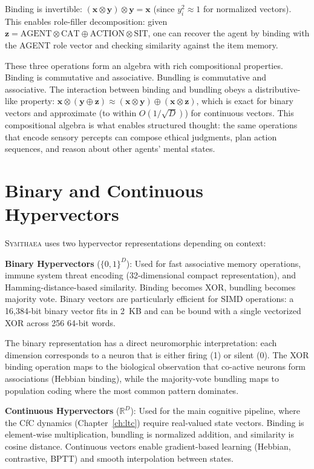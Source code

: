 \documentclass[12pt]{book}
\newcommand{\bind}{\otimes}
\newcommand{\bundle}{\oplus}
\newcommand{\symthaea}{\textsc{Symthaea}}
\newcommand{\R}{\mathbb{R}}
\begin{document}
Binding is invertible: $(\mathbf{x} \bind \mathbf{y}) \bind \mathbf{y} = \mathbf{x}$ (since $y_i^2 \approx 1$ for normalized vectors). This enables role-filler decomposition: given $\mathbf{z} = \text{AGENT} \bind \text{CAT} \bundle \text{ACTION} \bind \text{SIT}$, one can recover the agent by binding with the AGENT role vector and checking similarity against the item memory.

These three operations form an algebra with rich compositional properties. Binding is commutative and associative. Bundling is commutative and associative. The interaction between binding and bundling obeys a distributive-like property: $\mathbf{x} \bind (\mathbf{y} \bundle \mathbf{z}) \approx (\mathbf{x} \bind \mathbf{y}) \bundle (\mathbf{x} \bind \mathbf{z})$, which is exact for binary vectors and approximate (to within $O(1/\sqrt{D})$) for continuous vectors. This compositional algebra is what enables structured thought: the same operations that encode sensory percepts can compose ethical judgments, plan action sequences, and reason about other agents' mental states.

\section{Binary and Continuous Hypervectors}

\symthaea{} uses two hypervector representations depending on context:

\textbf{Binary Hypervectors} ($\{0,1\}^D$): Used for fast associative memory operations, immune system threat encoding (32-dimensional compact representation), and Hamming-distance-based similarity. Binding becomes XOR, bundling becomes majority vote. Binary vectors are particularly efficient for SIMD operations: a 16,384-bit binary vector fits in 2~KB and can be bound with a single vectorized XOR across 256 64-bit words.

The binary representation has a direct neuromorphic interpretation: each dimension corresponds to a neuron that is either firing (1) or silent (0). The XOR binding operation maps to the biological observation that co-active neurons form associations (Hebbian binding), while the majority-vote bundling maps to population coding where the most common pattern dominates.

\textbf{Continuous Hypervectors} ($\R^D$): Used for the main cognitive pipeline, where the CfC dynamics (Chapter~\ref{ch:ltc}) require real-valued state vectors. Binding is element-wise multiplication, bundling is normalized addition, and similarity is cosine distance. Continuous vectors enable gradient-based learning (Hebbian, contrastive, BPTT) and smooth interpolation between states.
\end{document}
